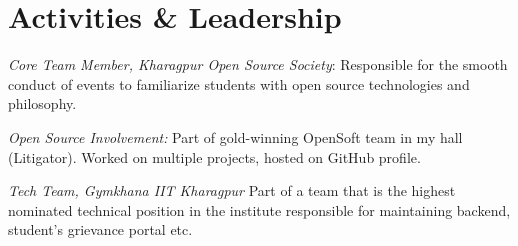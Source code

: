 \documentclass[]{deedy-resume-openfont}
\begin{document}
\begin{minipage}[t]{0.66\textwidth}
\section{Activities \& Leadership}

\vspace{\topsep} %
\begin{tightemize}


\item {\emph{Core Team Member, Kharagpur Open Source Society}:} Responsible for the smooth conduct of events to familiarize students with open source technologies and philosophy.\\
\item{\emph{Open Source Involvement:}} Part of gold-winning OpenSoft team in my hall (Litigator). Worked on multiple projects, hosted on GitHub profile. \\
\item{\emph{Tech Team, Gymkhana IIT Kharagpur}} Part of a team that is the highest nominated technical position in the institute responsible for maintaining backend, student's grievance portal etc.

\end{tightemize}
\sectionsep

\end{minipage} 
\end{document}
